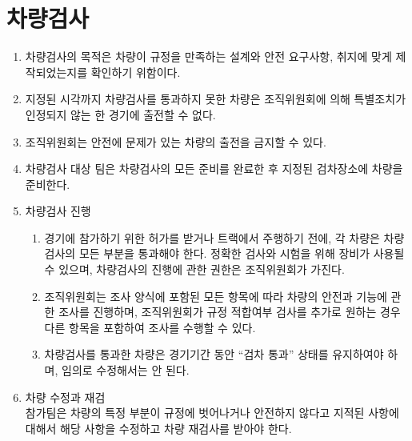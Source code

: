 \documentclass[final,a4paper,10pt]{report}
\begin{document}
\section{차량검사}\label{rule:formula-competition.vehicle-inspection}
\begin{enumerate}
  \item\label{rule:formula-competition.vehicle-inspection.purpose} 차량검사의 목적은 차량이 규정을 만족하는 설계와 안전 요구사항, 취지에 맞게 제작되었는지를 확인하기 위함이다.
  \item\label{rule:formula-competition.vehicle-inspection.deadline-miss-bars-entry} 지정된 시각까지 차량검사를 통과하지 못한 차량은 조직위원회에 의해 특별조치가 인정되지 않는 한 경기에 출전할 수 없다.
  \item\label{rule:formula-competition.vehicle-inspection.unsafe-entry-ban} 조직위원회는 안전에 문제가 있는 차량의 출전을 금지할 수 있다.
  \item\label{rule:formula-competition.vehicle-inspection.ready-at-inspection-site} 차량검사 대상 팀은 차량검사의 모든 준비를 완료한 후 지정된 검차장소에 차량을 준비한다.
  \item\label{rule:formula-competition.vehicle-inspection.inspection-process} 차량검사 진행
    \begin{enumerate}
      \item\label{rule:formula-competition.vehicle-inspection.inspection-process.pass-before-running} 경기에 참가하기 위한 허가를 받거나 트랙에서 주행하기 전에, 각 차량은 차량검사의 모든 부분을 통과해야 한다. 정확한 검사와 시험을 위해 장비가 사용될 수 있으며, 차량검사의 진행에 관한 권한은 조직위원회가 가진다.
      \item\label{rule:formula-competition.vehicle-inspection.inspection-process.form-review-with-extras} 조직위원회는 조사 양식에 포함된 모든 항목에 따라 차량의 안전과 기능에 관한 조사를 진행하며, 조직위원회가 규정 적합여부 검사를 추가로 원하는 경우 다른 항목을 포함하여 조사를 수행할 수 있다.
      \item\label{rule:formula-competition.vehicle-inspection.inspection-process.maintain-passed-status} 차량검사를 통과한 차량은 경기기간 동안 ``검차 통과'' 상태를 유지하여야 하며, 임의로 수정해서는 안 된다.
    \end{enumerate}
  \item\label{rule:formula-competition.vehicle-inspection.correct-and-reinspect} 차량 수정과 재검\\
    참가팀은 차량의 특정 부분이 규정에 벗어나거나 안전하지 않다고 지적된 사항에 대해서 해당 사항을 수정하고 차량 재검사를 받아야 한다.

\end{enumerate}
\end{document}
